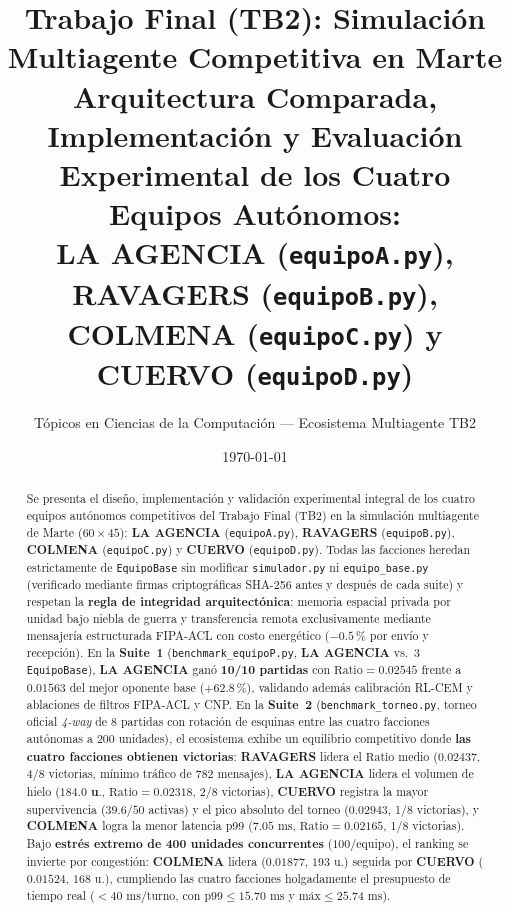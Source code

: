 \documentclass[10pt,a4paper]{article}
\title{\textbf{Trabajo Final (TB2): Simulación Multiagente Competitiva en Marte}\\
\large Arquitectura Comparada, Implementación y Evaluación Experimental de los Cuatro Equipos Autónomos:\\
\textbf{LA AGENCIA} (\texttt{equipoA.py}), \textbf{RAVAGERS} (\texttt{equipoB.py}), \textbf{COLMENA} (\texttt{equipoC.py}) y \textbf{CUERVO} (\texttt{equipoD.py})}
\author{Tópicos en Ciencias de la Computación --- Ecosistema Multiagente TB2}
\date{\today}
\begin{document}
\maketitle

\begin{abstract}
Se presenta el diseño, implementación y validación experimental integral de los cuatro equipos autónomos competitivos del Trabajo Final (TB2) en la simulación multiagente de Marte ($60\times 45$): \textbf{LA AGENCIA} (\texttt{equipoA.py}), \textbf{RAVAGERS} (\texttt{equipoB.py}), \textbf{COLMENA} (\texttt{equipoC.py}) y \textbf{CUERVO} (\texttt{equipoD.py}). Todas las facciones heredan estrictamente de \texttt{EquipoBase} sin modificar \texttt{simulador.py} ni \texttt{equipo\_base.py} (verificado mediante firmas criptográficas SHA-256 antes y después de cada suite) y respetan la \textbf{regla de integridad arquitectónica}: memoria espacial privada por unidad bajo niebla de guerra y transferencia remota exclusivamente mediante mensajería estructurada FIPA-ACL con costo energético ($-0.5\,\%$ por envío y recepción). En la \textbf{Suite~1} (\texttt{benchmark\_equipoP.py}, \textbf{LA AGENCIA} vs.\ 3 \texttt{EquipoBase}), \textbf{LA AGENCIA} ganó \textbf{10/10 partidas} con $\text{Ratio}=0.02545$ frente a $0.01563$ del mejor oponente base ($+62.8\,\%$), validando además calibración RL-CEM y ablaciones de filtros FIPA-ACL y CNP. En la \textbf{Suite~2} (\texttt{benchmark\_torneo.py}, torneo oficial \emph{4-way} de 8 partidas con rotación de esquinas entre las cuatro facciones autónomas a 200 unidades), el ecosistema exhibe un equilibrio competitivo donde \textbf{las cuatro facciones obtienen victorias}: \textbf{RAVAGERS} lidera el $\text{Ratio}$ medio ($\mathbf{0.02437}$, 4/8 victorias, mínimo tráfico de $782$ mensajes), \textbf{LA AGENCIA} lidera el volumen de hielo ($\mathbf{184.0\text{ u.}}$, $\text{Ratio}=0.02318$, 2/8 victorias), \textbf{CUERVO} registra la mayor supervivencia ($39.6/50$ activas) y el pico absoluto del torneo ($\mathbf{0.02943}$, 1/8 victorias), y \textbf{COLMENA} logra la menor latencia p99 ($7.05\text{ ms}$, $\text{Ratio}=0.02165$, 1/8 victorias). Bajo \textbf{estrés extremo de 400 unidades concurrentes} ($100$/equipo), el ranking se invierte por congestión: \textbf{COLMENA} lidera ($\mathbf{0.01877}$, $193\text{ u.}$) seguida por \textbf{CUERVO} ($\mathbf{0.01524}$, $168\text{ u.}$), cumpliendo las cuatro facciones holgadamente el presupuesto de tiempo real ($<40\text{ ms/turno}$, con $\text{p99}\le 15.70\text{ ms}$ y $\text{máx}\le 25.74\text{ ms}$).
\end{abstract}
\end{document}
